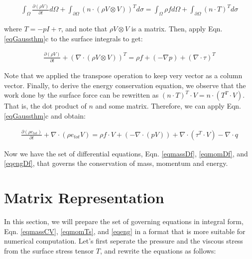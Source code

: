 \documentclass[12pt, letterpaper]{report}
\begin{document}
\begin{align}\label{eqmomTs}
   \int_\Omega \frac{\partial(\rho V)}{\partial t}d\Omega + \int_{\partial\Omega} \left(n \cdot (\rho
   V \mathop{\otimes} V)\right)^T d\sigma = \int_\Omega \rho f d\Omega + \int_{\partial\Omega} (n
   \cdot T)^T d\sigma
\end{align}

where $T = -pI + \tau$, and note that $\rho V \mathop{\otimes} V$ is a matrix. Then, apply Eqn.
\ref{eqGaussthm}c to the surface integrals to get:

\begin{align}\label{eqmomDf}
   \frac{\partial (\rho V)}{\partial t} + \left(\nabla \cdot (\rho V \mathop{\otimes} V)\right)^T = \rho f
   + (-\nabla p) + (\nabla \cdot \tau)^T
\end{align}

Note that we applied the transpose operation to keep very vector as a column vector. Finally, to
derive the energy conservation equation, we observe that the work done by the surface force can be
rewritten as $(n \cdot T)^T \cdot V = n \cdot (T^T \cdot V)$. That is, the dot product of $n$ and
some matrix. Therefore, we can apply Eqn. \ref{eqGaussthm}c and obtain:

\begin{align}\label{eqengDf}
   \frac{\partial (\rho e_{tot})}{\partial t} + \nabla \cdot (\rho e_{tot} V) = \rho f \cdot V +
   (-\nabla \cdot (pV)) + \nabla \cdot (\tau^T \cdot V) - \nabla \cdot q
\end{align}

Now we have the set of differential equations, Eqn. \ref{eqmassDf}, \ref{eqmomDf}, and
\ref{eqengDf}, that governs the conservation of mass, momentum and
energy.
\paraspace

\clearpage
\section{Matrix Representation}

In this section, we will prepare the set of governing equations in integral form, Eqn.
\ref{eqmassCV}, \ref{eqmomTs}, and \ref{eqeng} in a format that is more suitable for numerical
computation. Let's first seperate the pressure and the viscous stress from the surface stress tensor
$T$, and rewrite the equations as follows:
\end{document}
